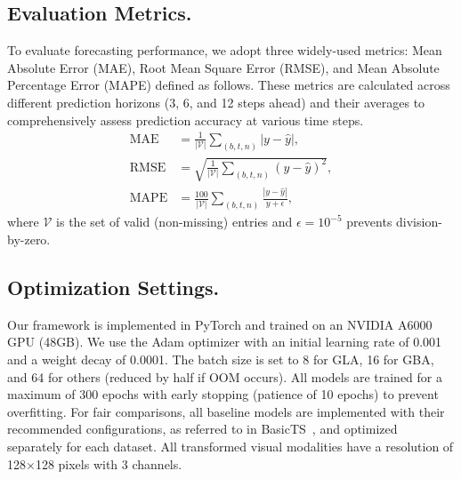 \subsection{Evaluation Metrics.}
\label{appx:metrics}
To evaluate forecasting performance, we adopt three widely-used metrics: Mean Absolute Error (MAE), Root Mean Square Error (RMSE), and Mean Absolute Percentage Error (MAPE) defined as follows. These metrics are calculated across different prediction horizons (3, 6, and 12 steps ahead) and their averages to comprehensively assess prediction accuracy at various time steps.
\begin{align}
\mathrm{MAE}&=\frac{1}{|\mathcal{V}|}\sum_{(b,t,n)}|y-\hat{y}|,\\
\mathrm{RMSE}&=\sqrt{\frac{1}{|\mathcal{V}|}\sum_{(b,t,n)}(y-\hat{y})^{2}},\\
\mathrm{MAPE}&=\frac{100}{|\mathcal{V}|}\sum_{(b,t,n)}\frac{|y-\hat{y}|}{y+\epsilon},
\end{align}
where $\mathcal{V}$ is the set of valid (non-missing) entries and $\epsilon=10^{-5}$ prevents division-by-zero.

\subsection{Optimization Settings.}
\label{appx:optim}
Our framework is implemented in PyTorch and trained on an NVIDIA A6000 GPU (48GB). We use the Adam optimizer with an initial learning rate of 0.001 and a weight decay of 0.0001. The batch size is set to 8 for GLA, 16 for GBA, and 64 for others (reduced by half if OOM occurs). All models are trained for a maximum of 300 epochs with early stopping (patience of 10 epochs) to prevent overfitting. For fair comparisons, all baseline models are implemented with their recommended configurations, as referred to in BasicTS~\cite{shao2024exploring}, and optimized separately for each dataset. All transformed visual modalities have a resolution of 128×128 pixels with 3 channels.


